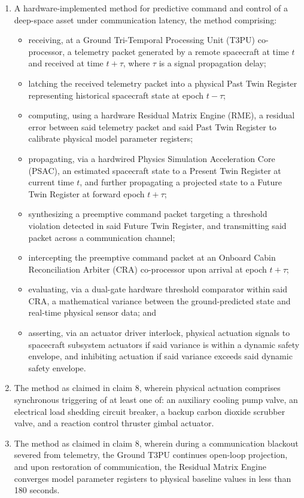 \documentclass[12pt,a4paper]{article}
\begin{document}
\begin{enumerate}
    \item A hardware-implemented method for predictive command and control of a deep-space asset under communication latency, the method comprising:
    \begin{itemize}
        \item receiving, at a Ground Tri-Temporal Processing Unit (T3PU) co-processor, a telemetry packet generated by a remote spacecraft at time $t$ and received at time $t+\tau$, where $\tau$ is a signal propagation delay;
        \item latching the received telemetry packet into a physical Past Twin Register representing historical spacecraft state at epoch $t-\tau$;
        \item computing, using a hardware Residual Matrix Engine (RME), a residual error between said telemetry packet and said Past Twin Register to calibrate physical model parameter registers;
        \item propagating, via a hardwired Physics Simulation Acceleration Core (PSAC), an estimated spacecraft state to a Present Twin Register at current time $t$, and further propagating a projected state to a Future Twin Register at forward epoch $t+\tau$;
        \item synthesizing a preemptive command packet targeting a threshold violation detected in said Future Twin Register, and transmitting said packet across a communication channel;
        \item intercepting the preemptive command packet at an Onboard Cabin Reconciliation Arbiter (CRA) co-processor upon arrival at epoch $t+\tau$;
        \item evaluating, via a dual-gate hardware threshold comparator within said CRA, a mathematical variance between the ground-predicted state and real-time physical sensor data; and
        \item asserting, via an actuator driver interlock, physical actuation signals to spacecraft subsystem actuators if said variance is within a dynamic safety envelope, and inhibiting actuation if said variance exceeds said dynamic safety envelope.
    \end{itemize}

    \item The method as claimed in claim 8, wherein physical actuation comprises synchronous triggering of at least one of: an auxiliary cooling pump valve, an electrical load shedding circuit breaker, a backup carbon dioxide scrubber valve, and a reaction control thruster gimbal actuator.

    \item The method as claimed in claim 8, wherein during a communication blackout severed from telemetry, the Ground T3PU continues open-loop projection, and upon restoration of communication, the Residual Matrix Engine converges model parameter registers to physical baseline values in less than 180 seconds.
\end{enumerate}
\end{document}
